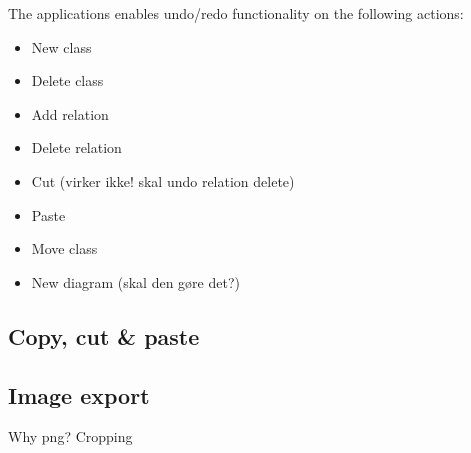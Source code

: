 The applications enables undo/redo functionality on the following actions:


\begin{itemize}
	\item New class
	\item Delete class
	\item Add relation
	\item Delete relation
	\item Cut (virker ikke! skal undo relation delete)
	\item Paste
	\item Move class
	\item New diagram (skal den gøre det?)
\end{itemize}


\subsection{Copy, cut \& paste}




\subsection{Image export}
Why png? Cropping




